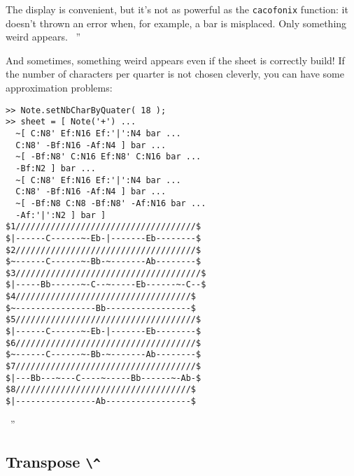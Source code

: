 \documentclass{article}
\newenvironment{meenv}{ \par \noindent \makebox[6em][r]{ \textcolor{mecolor}{Me}: `` --~}}{~''}
\newenvironment{myselfenv}{ \par \noindent \makebox[6em][r]{ \textcolor{myselfcolor}{Myself}: `` --~}}{~''}
\begin{document}
\begin{myselfenv}%
The display is convenient, but it's not as powerful as the \lstinline!cacofonix! function: it doesn't thrown an error when, for example, a bar is misplaced. Only something weird appears.%
\end{myselfenv}
\begin{meenv}%
And sometimes, something weird appears even if the sheet is correctly build! If the number of characters per quarter is not chosen cleverly, you can have some approximation problems:
\begin{lstlisting}
>> Note.setNbCharByQuater( 18 );
>> sheet = [ Note('+') ...
  ~[ C:N8' Ef:N16 Ef:'|':N4 bar ...
  C:N8' -Bf:N16 -Af:N4 ] bar ...
  ~[ -Bf:N8' C:N16 Ef:N8' C:N16 bar ...
  -Bf:N2 ] bar ...
  ~[ C:N8' Ef:N16 Ef:'|':N4 bar ...
  C:N8' -Bf:N16 -Af:N4 ] bar ...
  ~[ -Bf:N8 C:N8 -Bf:N8' -Af:N16 bar ...
  -Af:'|':N2 ] bar ]
$1////////////////////////////////////$
$|------C------~-Eb-|-------Eb--------$
$2////////////////////////////////////$
$~------C------~-Bb-~-------Ab--------$
$3/////////////////////////////////////$
$|-----Bb------~-C--~-----Eb------~-C--$
$4///////////////////////////////////$
$~----------------Bb-----------------$
$5////////////////////////////////////$
$|------C------~-Eb-|-------Eb--------$
$6////////////////////////////////////$
$~------C------~-Bb-~-------Ab--------$
$7////////////////////////////////////$
$|---Bb---~---C----~-----Bb------~-Ab-$
$8///////////////////////////////////$
$|----------------Ab-----------------$
\end{lstlisting}
\end{meenv}

\subsection{Transpose \lstinline!\^!}
\label{sec:Transpose}
\end{document}
